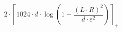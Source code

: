 \[2 \cdot \left\lceil 1024 \cdot d \cdot \log\left(1 + \frac{\left(L \cdot R\right)^{2}}{d \cdot \varepsilon^{2}}\right) \right\rceil_{+}\]
